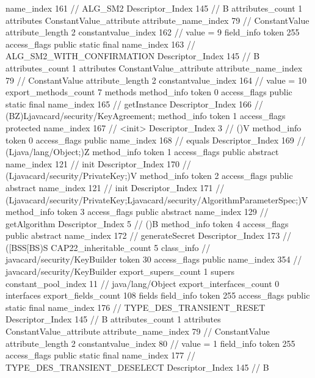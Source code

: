 {{{{{				name_index	161		// ALG_SM2
				Descriptor_Index	145		// B
				attributes_count	1
				attributes {
				ConstantValue_attribute {
					attribute_name_index	79		// ConstantValue
					attribute_length	2
					constantvalue_index	162		// value = 9
				}
				}
			}
			field_info {
				token	255
				access_flags	public static final
				name_index	163		// ALG_SM2_WITH_CONFIRMATION
				Descriptor_Index	145		// B
				attributes_count	1
				attributes {
				ConstantValue_attribute {
					attribute_name_index	79		// ConstantValue
					attribute_length	2
					constantvalue_index	164		// value = 10
				}
				}
			}
			}
			export_methods_count	7
			methods {
				method_info {
					token	0
					access_flags	public static final
					name_index	165		// getInstance
					Descriptor_Index	166		// (BZ)Ljavacard/security/KeyAgreement;
				}
				method_info {
					token	1
					access_flags	protected
					name_index	167		// <init>
					Descriptor_Index	3		// ()V
				}
				method_info {
					token	0
					access_flags	public
					name_index	168		// equals
					Descriptor_Index	169		// (Ljava/lang/Object;)Z
				}
				method_info {
					token	1
					access_flags	public abstract
					name_index	121		// init
					Descriptor_Index	170		// (Ljavacard/security/PrivateKey;)V
				}
				method_info {
					token	2
					access_flags	public abstract
					name_index	121		// init
					Descriptor_Index	171		// (Ljavacard/security/PrivateKey;Ljavacard/security/AlgorithmParameterSpec;)V
				}
				method_info {
					token	3
					access_flags	public abstract
					name_index	129		// getAlgorithm
					Descriptor_Index	5		// ()B
				}
				method_info {
					token	4
					access_flags	public abstract
					name_index	172		// generateSecret
					Descriptor_Index	173		// ([BSS[BS)S
				}
			}
			CAP22_inheritable_count	5
		}
		class_info {		// javacard/security/KeyBuilder
			token	30
			access_flags	public
			name_index	354		// javacard/security/KeyBuilder
			export_supers_count	1
			supers {
				constant_pool_index	11		// java/lang/Object
			}
			export_interfaces_count	0
			interfaces {
			}
			export_fields_count	108
			fields {
			field_info {
				token	255
				access_flags	public static final
				name_index	176		// TYPE_DES_TRANSIENT_RESET
				Descriptor_Index	145		// B
				attributes_count	1
				attributes {
				ConstantValue_attribute {
					attribute_name_index	79		// ConstantValue
					attribute_length	2
					constantvalue_index	80		// value = 1
				}
				}
			}
			field_info {
				token	255
				access_flags	public static final
				name_index	177		// TYPE_DES_TRANSIENT_DESELECT
				Descriptor_Index	145		// B
}}}}}
